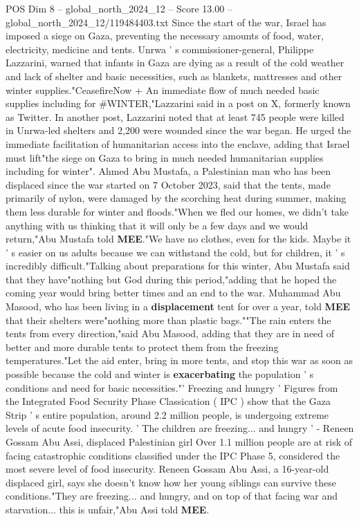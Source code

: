 \begin{textsample}{POS Dim 8 – global\_north\_2024\_12 – Score 13.00 – global\_north\_2024\_12/119484403.txt}
Since the start of the war, Israel has imposed a siege on Gaza, preventing the necessary amounts of food, water, electricity, medicine and tents.
Unrwa ' s commissioner-general, Philippe Lazzarini, warned that infants in Gaza are dying as a result of the cold weather and lack of shelter and basic necessities, such as blankets, mattresses and other winter supplies."CeasefireNow + An immediate flow of much needed basic supplies including for \#WINTER,"Lazzarini said in a post on X, formerly known as Twitter.
In another post, Lazzarini noted that at least 745 people were killed in Unrwa-led shelters and 2,200 were wounded since the war began.
He urged the immediate facilitation of humanitarian access into the enclave, adding that Israel must lift"the siege on Gaza to bring in much needed humanitarian supplies including for winter".
Ahmed Abu Mustafa, a Palestinian man who has been displaced since the war started on 7 October 2023, said that the tents, made primarily of nylon, were damaged by the scorching heat during summer, making them less durable for winter and floods."When we fled our homes, we didn't take anything with us thinking that it will only be a few days and we would return,"Abu Mustafa told \textbf{MEE}."We have no clothes, even for the kids.
Maybe it ' s easier on us adults because we can withstand the cold, but for children, it ' s incredibly difficult."Talking about preparations for this winter, Abu Mustafa said that they have"nothing but God during this period,"adding that he hoped the coming year would bring better times and an end to the war.
Muhammad Abu Masood, who has been living in a \textbf{displacement} tent for over a year, told \textbf{MEE} that their shelters were"nothing more than plastic bags.""The rain enters the tents from every direction,"said Abu Masood, adding that they are in need of better and more durable tents to protect them from the freezing temperatures."Let the aid enter, bring in more tents, and stop this war as soon as possible because the cold and winter is \textbf{exacerbating} the population ' s conditions and need for basic necessities."' Freezing and hungry ' Figures from the Integrated Food Security Phase Classication ( IPC ) show that the Gaza Strip ' s entire population, around 2.2 million people, is undergoing extreme levels of acute food insecurity. ' The children are freezing... and hungry ' - Reneen Gossam Abu Assi, displaced Palestinian girl Over 1.1 million people are at risk of facing catastrophic conditions classified under the IPC Phase 5, considered the most severe level of food insecurity.
Reneen Gossam Abu Assi, a 16-year-old displaced girl, says she doesn't know how her young siblings can survive these conditions."They are freezing... and hungry, and on top of that facing war and starvation... this is unfair,"Abu Assi told \textbf{MEE}.

\end{textsample}
